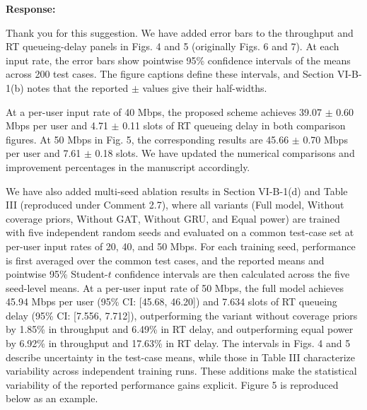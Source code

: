 \documentclass[11pt,a4paper]{article}
\newcommand{\qrev}[1]{{\color{qinrev}#1}}
\begin{document}
\textbf{Response:}\par

Thank you for this suggestion. We have added error bars to the throughput and RT queueing-delay panels in \qrev{Figs. 4 and 5 (originally Figs. 6 and 7)}. At each input rate, the error bars show pointwise 95\% confidence intervals of the means across 200 test cases. The figure captions define these intervals, and \qrev{Section VI-B-1(b) notes that} the reported $\pm$ values give their half-widths.
\par

At a per-user input rate of 40 Mbps, the proposed scheme achieves 39.07 $\pm$ 0.60 Mbps per user and 4.71 $\pm$ 0.11 slots of RT queueing delay in both comparison figures. At 50 Mbps in \qrev{Fig. 5}, the corresponding results are 45.66 $\pm$ 0.70 Mbps per user and 7.61 $\pm$ 0.18 slots. We have updated the numerical comparisons and improvement percentages in the manuscript accordingly.
\par

We have also added multi-seed ablation results in \qrev{Section VI-B-1(d)} and Table III (reproduced under Comment 2.7), where all variants (Full model, Without coverage priors, Without GAT, Without GRU, and Equal power) are trained with five independent random seeds and evaluated on a common test-case set at per-user input rates of 20, 40, and 50 Mbps. For each training seed, performance is first averaged over the common test cases, and the reported means and pointwise 95\% Student-$t$ confidence intervals are then calculated across the five seed-level means. At a per-user input rate of 50 Mbps, the full model achieves 45.94 Mbps per user (95\% CI: [45.68, 46.20]) and 7.634 slots of RT queueing delay (95\% CI: [7.556, 7.712]), outperforming the variant without coverage priors by 1.85\% in throughput and 6.49\% in RT delay, and outperforming equal power by 6.92\% in throughput and 17.63\% in RT delay. The intervals in \qrev{Figs. 4 and 5} describe uncertainty in the test-case means, while those in Table III characterize variability across independent training runs. These additions make the statistical variability of the reported performance gains explicit. \qrev{Figure 5} is reproduced below as an example.
\par
\end{document}

